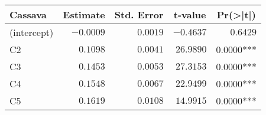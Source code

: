 \begin{table}[!tbp]
\begin{center}
\begin{tabular}{lrrrr}
\hline\hline
\multicolumn{1}{l}{Cassava}&\multicolumn{1}{c}{Estimate}&\multicolumn{1}{c}{Std. Error}&\multicolumn{1}{c}{t-value}&\multicolumn{1}{c}{Pr(\textgreater |t|)}\tabularnewline
\hline
(intercept)&$-0.0009$&$0.0019$&$-0.4637$&$0.6429$\tabularnewline
C2&$ 0.1098$&$0.0041$&$26.9890$&$0.0000$***\tabularnewline
C3&$ 0.1453$&$0.0053$&$27.3153$&$0.0000$***\tabularnewline
C4&$ 0.1548$&$0.0067$&$22.9499$&$0.0000$***\tabularnewline
C5&$ 0.1619$&$0.0108$&$14.9915$&$0.0000$***\tabularnewline
\hline
\end{tabular}\end{center}

\end{table}
